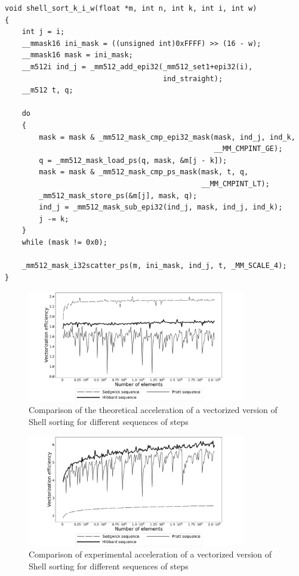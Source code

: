 \documentclass[
11pt,%
tightenlines,%
twoside,%
onecolumn,%
nofloats,%
nobibnotes,%
nofootinbib,%
superscriptaddress,%
noshowpacs,%
centertags]%
{revtex4}
\begin{document}
\begin{lstlisting}
void shell_sort_k_i_w(float *m, int n, int k, int i, int w)
{
    int j = i;
    __mmask16 ini_mask = ((unsigned int)0xFFFF) >> (16 - w);
    __mmask16 mask = ini_mask;
    __m512i ind_j = _mm512_add_epi32(_mm512_set1+epi32(i),
                                     ind_straight);
    __m512 t, q;

    do
    {
        mask = mask & _mm512_mask_cmp_epi32_mask(mask, ind_j, ind_k,
                                                 __MM_CMPINT_GE);
        q = _mm512_mask_load_ps(q, mask, &m[j - k]);
        mask = mask & _mm512_mask_cmp_ps_mask(mask, t, q,
                                              __MM_CMPINT_LT);
        _mm512_mask_store_ps(&m[j], mask, q);
        ind_j = _mm512_mask_sub_epi32(ind_j, mask, ind_j, ind_k);
        j -= k;
    }
    while (mask != 0x0);
    
    _mm512_mask_i32scatter_ps(m, ini_mask, ind_j, t, _MM_SCALE_4);
}
\end{lstlisting}

\begin{figure}[h]
\setcaptionmargin{5mm}
\onelinecaptionstrue  %
\includegraphics[width=0.85\textwidth]{pics/experimental_eff.pdf}
\caption{Comparison of the theoretical acceleration of a vectorized version of Shell sorting for different sequences of steps}\label{fig:1}
\end{figure}

\begin{figure}[h]
\setcaptionmargin{5mm}
\onelinecaptionstrue  %
\includegraphics[width=0.85\textwidth]{pics/theoretical_eff.pdf}
\caption{Comparison of experimental acceleration of a vectorized version of Shell sorting for different sequences of steps}\label{fig:1}
\end{figure}
\end{document}
